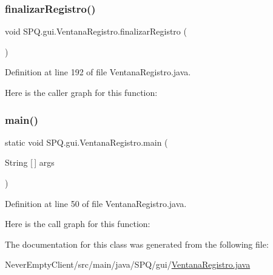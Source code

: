 \subsubsection{\texorpdfstring{finalizar\+Registro()}{finalizarRegistro()}}
{\footnotesize\ttfamily void S\+P\+Q.\+gui.\+Ventana\+Registro.\+finalizar\+Registro (\begin{DoxyParamCaption}{ }\end{DoxyParamCaption})}



Definition at line 192 of file Ventana\+Registro.\+java.

Here is the caller graph for this function\+:
\mbox{\label{class_s_p_q_1_1gui_1_1_ventana_registro_a8d80a5efba104ecaefab065592e23a68}} 
\subsubsection{\texorpdfstring{main()}{main()}}
{\footnotesize\ttfamily static void S\+P\+Q.\+gui.\+Ventana\+Registro.\+main (\begin{DoxyParamCaption}\item[{String \mbox{[}$\,$\mbox{]}}]{args }\end{DoxyParamCaption})\hspace{0.3cm}{\ttfamily [static]}}



Definition at line 50 of file Ventana\+Registro.\+java.

Here is the call graph for this function\+:


The documentation for this class was generated from the following file\+:\begin{DoxyCompactItemize}
\item 
Never\+Empty\+Client/src/main/java/\+S\+P\+Q/gui/\mbox{\hyperlink{_ventana_registro_8java}{Ventana\+Registro.\+java}}\end{DoxyCompactItemize}
